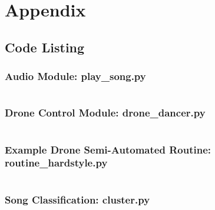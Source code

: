 \newpage
\onecolumn
\section{Appendix}
\subsection{Code Listing}
\subsubsection{Audio Module: play\_song.py} \label{code:play_song.py}
\inputminted[fontsize=\footnotesize,linenos]{python}{../code/play_song.py}

\newpage
\subsubsection{Drone Control Module: drone\_dancer.py}\label{code:drone_dancer.py}
\inputminted[fontsize=\footnotesize,linenos]{python}{../code/PS-drone/drone_dancer.py}

\newpage
\subsubsection{Example Drone Semi-Automated Routine: routine\_hardstyle.py}\label{code:routine_hardstyle.py}
\inputminted[fontsize=\footnotesize,linenos]{python}{../code/PS-drone/routine_hardstyle.py}

\newpage
\subsubsection{Song Classification: cluster.py}\label{code:cluster.py}
\inputminted[fontsize=\footnotesize,linenos]{python}{../code/classification/cluster.py}
